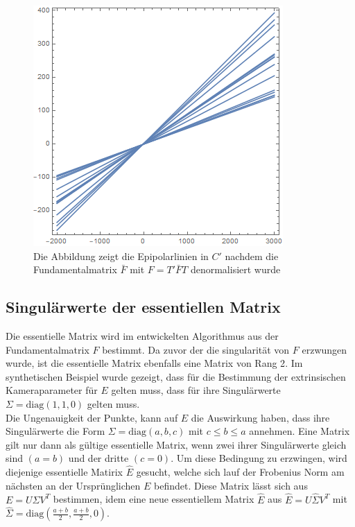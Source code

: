 \begin{figure}[!htb]
	\includegraphics[width=\linewidth]{images/LPrime_PC2_F_Constraint_denormalized.png}
	\caption[Epipolarlinien in $C$ aus singulärer denormalisierter Fundamentalmatrix]{Die Abbildung zeigt die Epipolarlinien in $C'$ nachdem die Fundamentalmatrix $\bar{F}$ mit $F = T'\bar{F}T$ denormalisiert wurde}
	\label{fig:EpipoleWithF2Denorm}
	\endminipage\hfill
\end{figure}

\pagebreak

\subsection{Singulärwerte der essentiellen Matrix}

Die essentielle Matrix wird im entwickelten Algorithmus aus der Fundamentalmatrix $F$ bestimmt. Da zuvor der die singularität von $F$ erzwungen wurde, ist die essentielle Matrix ebenfalls eine Matrix von Rang 2\cite{HZ}. Im synthetischen Beispiel wurde gezeigt, dass für die Bestimmung der extrinsischen Kameraparameter für $E$ gelten muss, dass für ihre Singulärwerte $\Sigma = \text{diag}(1,1,0)$ gelten muss. \\

Die Ungenauigkeit der Punkte, kann auf $E$ die Auswirkung haben, dass ihre Singulärwerte die Form $\Sigma = \text{diag}(a,b,c)$ mit $c \leq b \leq a$ annehmen. Eine Matrix gilt nur dann als gültige essentielle Matrix, wenn zwei ihrer Singulärwerte gleich sind $(a = b)$ und der dritte $(c=0)$. Um diese Bedingung zu erzwingen, wird diejenige essentielle Matirix $\hat{E}$ gesucht, welche sich lauf der Frobenius Norm am nächsten an der Ursprünglichen $E$ befindet\cite{HZ,Ferid}. Diese Matrix lässt sich aus $E = U \Sigma V^T$ bestimmen, idem eine neue essentiellem Matrix $\hat{E}$ aus $\hat{E} = U \hat{\Sigma}V^T$ mit $\hat{\Sigma} = \text{diag}(\frac{a+b}{2},\frac{a+b}{2},0)$\cite{HZ}.\\

